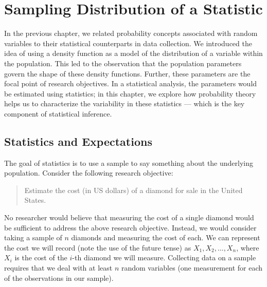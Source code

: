 \documentclass[
  letterpaper,
  DIV=11,
  numbers=noendperiod]{scrreprt}
\theoremstyle{definition}
\theoremstyle{plain}
\theoremstyle{definition}
\theoremstyle{remark}
\begin{document}

\chapter{Sampling Distribution of a
Statistic}\label{sec-samplingdistributions}

\providecommand{\norm}[1]{\left\lVert#1\right\rVert}
\providecommand{\abs}[1]{\left\lvert#1\right\rvert}
\providecommand{\dist}[1]{\stackrel{\text{#1}}{\sim}}
\providecommand{\ind}[1]{\mathbb{I}\left(#1\right)}
\providecommand{\bm}[1]{\mathbf{#1}}
\providecommand{\bs}[1]{\boldsymbol{#1}}
\providecommand{\Ell}{\mathcal{L}}
\providecommand{\indep}{\perp\negthickspace\negmedspace\perp}

In the previous chapter, we related probability concepts associated with
random variables to their statistical counterparts in data collection.
We introduced the idea of using a density function as a model of the
distribution of a variable within the population. This led to the
observation that the population parameters govern the shape of these
density functions. Further, these parameters are the focal point of
research objectives. In a statistical analysis, the parameters would be
estimated using statistics; in this chapter, we explore how probability
theory helps us to characterize the variability in these statistics ---
which is the key component of statistical inference.

\section{Statistics and Expectations}\label{statistics-and-expectations}

The goal of statistics is to use a sample to say something about the
underlying population. Consider the following research objective:

\begin{quote}
Estimate the cost (in US dollars) of a diamond for sale in the United
States.
\end{quote}

No researcher would believe that measuring the cost of a single diamond
would be sufficient to address the above research objective. Instead, we
would consider taking a sample of \(n\) diamonds and measuring the cost
of each. We can represent the cost we will record (note the use of the
future tense) as \(X_1, X_2, \dotsc, X_n\), where \(X_i\) is the cost of
the \(i\)-th diamond we will measure. Collecting data on a sample
requires that we deal with at least \(n\) random variables (one
measurement for each of the observations in our sample).
\end{document}
